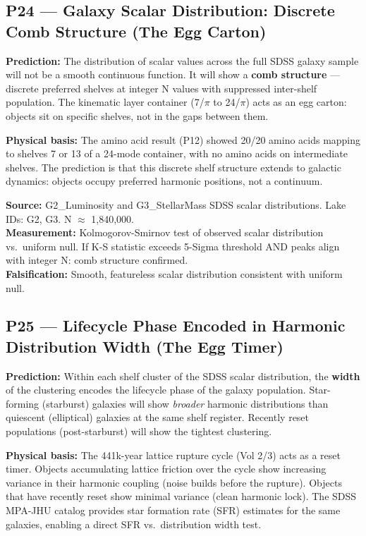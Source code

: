 \documentclass[12pt, letterpaper]{article}
\begin{document}
\subsection*{P24 --- Galaxy Scalar Distribution: Discrete Comb Structure
(The Egg Carton)}

\textbf{Prediction:} The distribution of scalar values across the full SDSS
galaxy sample will not be a smooth continuous function. It will show a
\textbf{comb structure} --- discrete preferred shelves at integer N values
with suppressed inter-shelf population. The kinematic layer container
(7/$\pi$ to 24/$\pi$) acts as an egg carton: objects sit on specific shelves,
not in the gaps between them.

\medskip
\textbf{Physical basis:} The amino acid result (P12) showed 20/20 amino acids
mapping to shelves 7 or 13 of a 24-mode container, with no amino acids on
intermediate shelves. The prediction is that this discrete shelf structure
extends to galactic dynamics: objects occupy preferred harmonic positions, not
a continuum.

\medskip
\textbf{Source:} G2\_Luminosity and G3\_StellarMass SDSS scalar distributions.
Lake IDs: G2, G3. N $\approx$ 1,840,000.\\
\textbf{Measurement:} Kolmogorov-Smirnov test of observed scalar distribution
vs.\ uniform null. If K-S statistic exceeds 5-Sigma threshold AND peaks align
with integer N: comb structure confirmed.\\
\textbf{Falsification:} Smooth, featureless scalar distribution consistent
with uniform null.

\subsection*{P25 --- Lifecycle Phase Encoded in Harmonic Distribution Width
(The Egg Timer)}

\textbf{Prediction:} Within each shelf cluster of the SDSS scalar distribution,
the \textbf{width} of the clustering encodes the lifecycle phase of the galaxy
population. Star-forming (starburst) galaxies will show \textit{broader}
harmonic distributions than quiescent (elliptical) galaxies at the same
shelf register. Recently reset populations (post-starburst) will show the
tightest clustering.

\medskip
\textbf{Physical basis:} The 441k-year lattice rupture cycle (Vol 2/3) acts
as a reset timer. Objects accumulating lattice friction over the cycle show
increasing variance in their harmonic coupling (noise builds before the
rupture). Objects that have recently reset show minimal variance (clean
harmonic lock). The SDSS MPA-JHU catalog provides star formation rate (SFR)
estimates for the same galaxies, enabling a direct SFR vs.\ distribution
width test.
\end{document}
